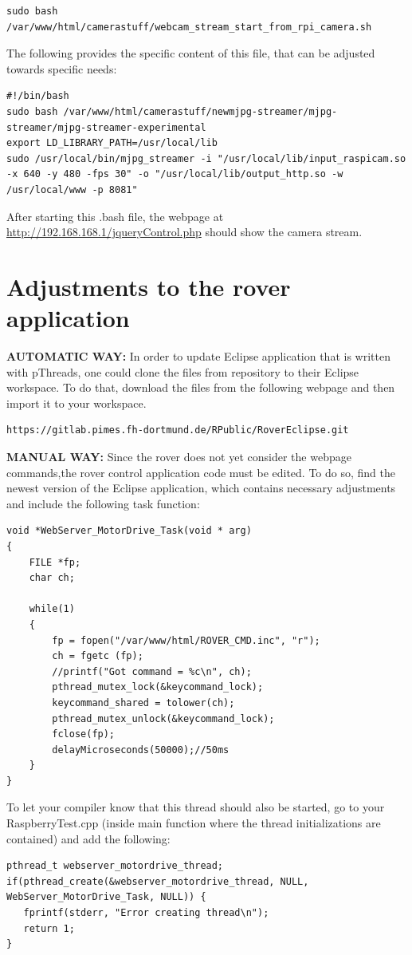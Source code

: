 \begin{lstlisting}
sudo bash /var/www/html/camerastuff/webcam_stream_start_from_rpi_camera.sh
\end{lstlisting}
The following provides the specific content of this file, that can be adjusted towards specific needs:
\begin{lstlisting}
#!/bin/bash
sudo bash /var/www/html/camerastuff/newmjpg-streamer/mjpg-streamer/mjpg-streamer-experimental 
export LD_LIBRARY_PATH=/usr/local/lib
sudo /usr/local/bin/mjpg_streamer -i "/usr/local/lib/input_raspicam.so -x 640 -y 480 -fps 30" -o "/usr/local/lib/output_http.so -w /usr/local/www -p 8081"
\end{lstlisting}
After starting this .bash file, the webpage at \url{http://192.168.168.1/jqueryControl.php} should show the camera stream.
\section{Adjustments to the rover application}
\textbf{AUTOMATIC WAY:} In order to update Eclipse application that is written with pThreads, one could clone the files from repository to their Eclipse workspace. To do that, download the files from the following webpage and then import it to your workspace.
\begin{lstlisting}
https://gitlab.pimes.fh-dortmund.de/RPublic/RoverEclipse.git
\end{lstlisting}
\textbf{MANUAL WAY:} Since the rover does not yet consider the webpage commands,the rover control application code must be edited. To do so, find the newest version of the Eclipse application, which contains necessary adjustments and include the following task function:
\begin{lstlisting}
void *WebServer_MotorDrive_Task(void * arg)
{
	FILE *fp;
	char ch;

	while(1)
	{
		fp = fopen("/var/www/html/ROVER_CMD.inc", "r");
		ch = fgetc (fp);
		//printf("Got command = %c\n", ch);
		pthread_mutex_lock(&keycommand_lock);	
		keycommand_shared = tolower(ch);
		pthread_mutex_unlock(&keycommand_lock);
		fclose(fp);
		delayMicroseconds(50000);//50ms
	}
}
\end{lstlisting}
To let your compiler know that this thread should also be started, go to your RaspberryTest.cpp (inside main function where the thread initializations are contained) and add the following:
\begin{lstlisting}
pthread_t webserver_motordrive_thread;
if(pthread_create(&webserver_motordrive_thread, NULL, WebServer_MotorDrive_Task, NULL)) {
   fprintf(stderr, "Error creating thread\n");
   return 1;
}
\end{lstlisting}
